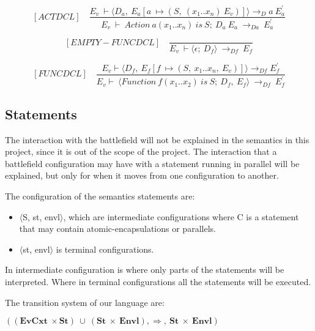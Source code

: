     	
  	\[
   	[ACTDCL] \quad
   	\dfrac{E_v \ \vdash \langle D_a, \ E_a[a \ \mapsto (S, \ (x_1 .. x_n) \ E_v)] \rangle \rightarrow_Da \ E_a^{'}}{E_v \ \vdash \ Action \ a(x_1 .. x_n) \ is \ S; \ D_a \ E_a \ \rightarrow_{Da} \ E_a^{'}}
   	\]
    	
   	\[
   	[EMPTY-FUNCDCL] \quad
   	\dfrac{}{E_v \ \vdash \langle \epsilon; \ D_f \rangle \ \rightarrow_{Df} \ E_f}
   	\]
   	
   	\[
   	[FUNCDCL] \quad
   	\dfrac{E_v \vdash \langle D_f, \ E_f[f \ \mapsto (S, \ x_1 .. x_n, \ E_v)] \rangle \rightarrow_{Df} E_f^{'}}{E_v \vdash \ \langle Function \ f(x_1 .. x_2) \ is \ S; \ D_f, \ E_f \rangle \ \rightarrow_{Df} \ E_f^{'}}
   	\]
   	\subsection{Statements}
   	The interaction with the battlefield will not be explained in the semantics in this project, since it is out of the scope of the project. The interaction that a battlefield configuration may have with a statement running in parallel will be explained, but only for when it moves from one configuration to another.
   	
   	The configuration of the semantics statements are:
   	
   	\begin{itemize}
   		\item \begin{math} \langle \end{math}S, st, envl\begin{math} \rangle \end{math}, which are intermediate configurations where C is a statement that may contain atomic-encapsulations or parallels.
   		\item \begin{math} \langle \end{math}st, envl\begin{math} \rangle \end{math} is terminal configurations.
   	\end{itemize}
   	
   	In intermediate configuration is where only parts of the statements will be interpreted. Where in terminal configurations  all the statements will be executed.
   	
   	The transition system of our language are:
   	 
   	\begin{math}
   		((\boldsymbol{EvCxt} \ \times \boldsymbol{St}) \ \cup \ (\boldsymbol{St} \ \times \ \boldsymbol{Envl}), \Rightarrow, \ \boldsymbol{St} \ \times \ \boldsymbol{Envl})
   	\end{math}
   	
